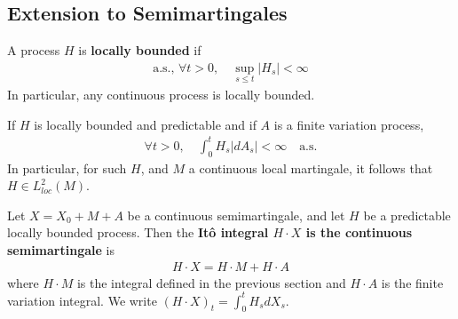 \documentclass[12pt,a4paper]{article}
\begin{document}
\subsection{Extension to Semimartingales}

 A process $H$ is \textbf{locally bounded} if
\begin{align*}
\text{a.s., } \forall t>0, \quad \sup_{s\leq t} |H_s| < \infty
\end{align*}
In particular, any continuous process is locally bounded.
\s

\fact If $H$ is locally bounded and predictable and if $A$ is a finite variation process,
\begin{align*}
\forall t>0, \quad \int_0^t H_s |dA_s| < \infty \quad \text{a.s.}
\end{align*}
In particular, for such $H$, and $M$ a continuous local martingale, it follows that $H\in L_{loc}^2(M)$.
\s

 Let $X = X_0 + M + A$ be a continuous semimartingale, and let $H$ be a predictable locally bounded process. Then the \textbf{It\^o integral $H\cdot X$ is the continuous semimartingale} is
\begin{align*}
H \cdot X = H\cdot M + H\cdot A
\end{align*}
where $H\cdot M$ is the integral defined in the previous section and $H\cdot A$ is the finite variation integral. We write $(H\cdot X)_t = \int_0^t H_s dX_s$.
\s
\end{document}

